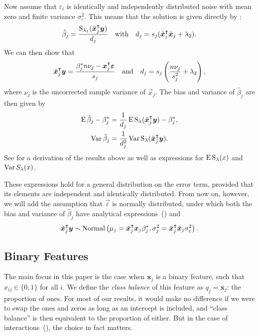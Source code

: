 Now assume that \(\varepsilon_i\) is identically and independently distributed noise with
mean zero and finite variance \(\sigma_\varepsilon^2\). This means that the solution is
given directly by :
\[
  \hat{\beta}_j = \frac{\operatorname{S}_{\lambda_1}(\tilde{\boldsymbol{x}}_j^\intercal \boldsymbol{y})}{d_j}\quad\text{with}\quad d_j = s_j(\tilde{\boldsymbol{x}}_j^\intercal \tilde{\boldsymbol{x}}_j + \lambda_2).
\]
We can then show that
\begin{equation}
  \label{eq:z-d}
  \tilde{\boldsymbol{x}}_j^\intercal \boldsymbol{y} = \frac{\beta_j^* n \nu_j- \boldsymbol{x}_j^\intercal \boldsymbol{\varepsilon}}{s_j}
  \quad\text{and}\quad
  d_j = s_j\left(\frac{n \nu_j}{s_j^2} + \lambda_2\right),
\end{equation}
where \(\nu_j\) is the uncorrected sample variance of \(\vec{x}_j\).
The bias and variance of \(\hat{\beta}_j\) are then given by
\begin{align}
  \operatorname{E} \hat\beta_j - \beta_j^* & = \frac{1}{d_j}\operatorname{E} \operatorname{S}_\lambda(\tilde{\boldsymbol{x}}_j^\intercal \boldsymbol{y}) - \beta^*_j,\label{eq:bias} \\
  \operatorname{Var} \hat\beta_j           & = \frac{1}{d_j^2} \operatorname{Var} \operatorname{S}_\lambda(\tilde{\boldsymbol{x}}_j^\intercal \boldsymbol{y}).\label{eq:variance}
\end{align}
See  for a derivation of the results above
as well as expressions for \(\operatorname{E} \operatorname{S}_\lambda(x)\) and \(\operatorname{Var} S_\lambda(x)\).

These expressions hold for a general distribution on the error term, provided that its
elements are independent and identically distributed. From now on, however, we will add the
assumption that \(\vec{\varepsilon}\) is normally distributed, under which both the bias
and variance of \(\hat{\beta}_j\) have analytical
expressions~() and
\[
  \tilde{\boldsymbol{x}}_j^\intercal \boldsymbol{y} \sim \operatorname{Normal}\left(\mu_j = \tilde{\boldsymbol{x}}_j^\intercal\boldsymbol{x}_j \beta_j^*, \sigma_j^2 = \tilde{\boldsymbol{x}}_j^\intercal\tilde{\boldsymbol{x}}_j \sigma_\varepsilon^2 \right).
\]

\subsection{Binary Features}%
\label{sec:theory-binary-features}

The main focus in this paper is the case when \(\bm{x}_j\) is a binary feature, such that
\(x_{ij} \in \{0, 1\}\) for all \(i\). We define the \emph{class balance} of this feature
as \(q_j = \bar{\bm{x}}_j\): the proportion of ones. For most of our results, it would make
no difference if we were to swap the ones and zeros as long as an intercept is included,
and ``class balance'' is then equivalent to the proportion of either. But in the case of
interactions~(), the choice in fact matters.

